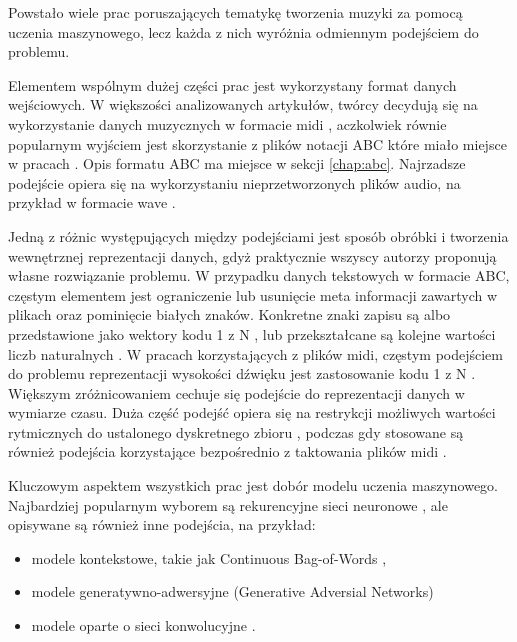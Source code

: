 {{    %
    Powstało wiele prac poruszających tematykę tworzenia muzyki za pomocą uczenia maszynowego, 
    lecz każda z nich wyróżnia odmiennym podejściem do problemu.

    Elementem wspólnym dużej części prac jest wykorzystany format danych wejściowych.
    W większości analizowanych artykułów, twórcy decydują się na wykorzystanie 
    danych muzycznych w formacie midi \cite{Hadjeres2016DeepBachAS, Mogren2016CRNNGANCR, Wu2017AHR, Yang2017MidiNetAC}, 
    aczkolwiek równie popularnym wyjściem jest skorzystanie z plików notacji ABC które miało miejsce w pracach \cite{Agarwala2017MusicCU, Sturm2015FolkMS}. 
    Opis formatu ABC ma miejsce w sekcji \ref{chap:abc}.
    Najrzadsze podejście opiera się na wykorzystaniu nieprzetworzonych plików audio, 
    na przykład w formacie wave \cite{Oord2016WaveNetAG}.
    
    Jedną z różnic występujących między podejściami jest sposób obróbki i tworzenia
    wewnętrznej reprezentacji danych, gdyż praktycznie wszyscy autorzy 
    proponują własne rozwiązanie problemu. 
    W przypadku danych tekstowych w formacie ABC, częstym elementem jest ograniczenie
    lub usunięcie meta informacji zawartych w plikach \cite{Agarwala2017MusicCU, Sturm2015FolkMS} oraz pominięcie białych znaków.
    Konkretne znaki zapisu są albo przedstawione jako wektory kodu 1 z N \cite{Sturm2015FolkMS}, 
    lub przekształcane są kolejne wartości liczb naturalnych \cite{Agarwala2017MusicCU}.
    W pracach korzystających z plików midi, częstym podejściem do problemu reprezentacji wysokości
    dźwięku jest zastosowanie kodu 1 z N \cite{Yang2017MidiNetAC}. Większym zróżnicowaniem cechuje się podejście
    do reprezentacji danych w wymiarze czasu. Duża część podejść opiera się na restrykcji możliwych
    wartości rytmicznych do ustalonego dyskretnego zbioru \cite{Hadjeres2016DeepBachAS, Wu2017AHR}, 
    podczas gdy stosowane są również podejścia korzystające bezpośrednio z taktowania 
    plików midi \cite{Mogren2016CRNNGANCR}.

    Kluczowym aspektem wszystkich prac jest dobór modelu uczenia maszynowego.
    Najbardziej popularnym wyborem są rekurencyjne sieci neuronowe \cite{Agarwala2017MusicCU, Mogren2016CRNNGANCR, Souza2018DeepNN, Sturm2015FolkMS},
    ale opisywane są również inne podejścia, na przykład:
    \begin{itemize}
      \setlength\itemsep{-0.5em}
      \item modele kontekstowe, takie jak Continuous Bag-of-Words \cite{Agarwala2017MusicCU},
      \item modele generatywno-adwersyjne (Generative Adversial Networks) \cite{Agarwala2017MusicCU, Mogren2016CRNNGANCR}
      \item modele oparte o sieci konwolucyjne \cite{Oord2016WaveNetAG, Yang2017MidiNetAC}.
    \end{itemize}

}}
